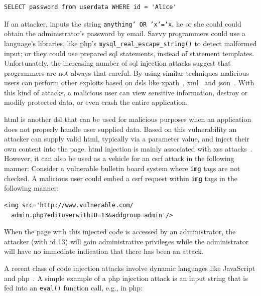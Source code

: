 \documentclass[conference]{IEEEtran}
\begin{document}
\bgroup \lstset{language=SQL}
\begin{small}
\begin{lstlisting}
SELECT password from userdata WHERE id = 'Alice'
\end{lstlisting}
\end{small}
\egroup

\noindent
If an attacker, inputs the string {\tt anything' OR 'x'='x}, he or
she could could obtain the administrator's password by email.
Savvy programmers could use a language's libraries, like {\sc php}'s
{\tt mysql\_real\_escape\_string()} to detect malformed input; or they
could use prepared {\sc sql} statements, instead of statement
templates. Unfortunately,
the increasing number of {\sc sql} injection attacks
suggest that programmers are not always that careful.
By using similar techniques malicious users can perform other exploits based on
{\sc dsl}s like {\sc xp}ath~\cite{SW06,CDL07,MKS09},
{\sc xml}~\cite{MSM13} and {\sc json}~\cite{SMS13}. With this kind of
attacks, a malicious user can view sensitive information, destroy or
modify protected data, or even crash the entire application.

{\sc html} is another {\sc dsl} that can be used for malicious purposes
when an application does not properly handle user supplied data. Based
on this vulnerability an attacker can supply valid {\sc html},
typically via a parameter value, and inject their own content into the
page. {\sc html} injection is mainly associated with {\sc xss}
attacks~\cite{BJM08,LZRL09}. However, it can also be used as a
vehicle for an {\sc csrf} attack in the following manner:
Consider a vulnerable bulletin board system where {\tt img} tags are not checked.
A malicious user could embed a {\sc csrf} request within {\tt img}
tags in the following manner:

\bgroup \lstset{language=HTML}
\begin{small}
\begin{lstlisting}
<img src='http://www.vulnerable.com/
  admin.php?edituserwithID=13&addgroup=admin'/>
\end{lstlisting}
\end{small}
\egroup

\noindent
When the page with this injected code is accessed by an administrator,
the attacker (with {\sc id} 13) will gain administrative privileges
while the administrator will have no immediate indication that there
has been an attack.

A recent class of code injection attacks involve dynamic languages
like JavaScript and {\sc php}~\cite{SFVM09,EWKK09,SMS13}.
A simple example of a {\sc php} injection attack is an input string
that is fed into an {\tt eval()} function call, e.g., in {\sc php}:
\end{document}
